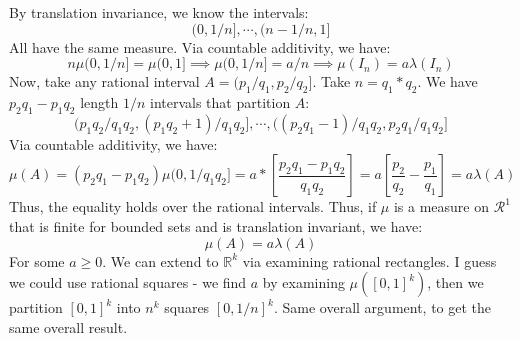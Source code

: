\documentclass[12pt,a4paper]{article}
\newcommand{\1}[1]{\mathbbm{1}\left\{ #1 \right\}}
\newcommand{\R}{\mathbb{R}}
\newcommand{\rcal}{\mathcal{R}}
\begin{document}
By translation invariance, we know the intervals:
$$
	(0,1/n], \cdots, (n-1/n,1]
$$
All have the same measure. Via countable additivity, we have:
$$
	n\mu(0,1/n] = \mu(0,1] \implies \mu(0,1/n] = a/n \implies
	\mu(I_n) = a\lambda(I_n)
$$
Now, take any rational interval $A = (p_1/q_1,p_2/q_2]$. Take $n = q_1 * q_2$. We have $p_2q_1 - p_1q_2$ length $1/n$ intervals that partition $A$:
$$
	(p_1q_2/q_1q_2, (p_1q_2 + 1)/q_1q_2], \cdots,
	((p_2q_1-1)/q_1q_2, p_2q_1/q_1q_2]
$$
Via countable additivity, we have:
$$
	\mu(A) = (p_2q_1 - p_1q_2)\mu(0,1/q_1q_2] =
	a * \left[\frac{p_2q_1 - p_1q_2}{q_1q_2}\right] = a \left[\frac{p_2}{q_2} - \frac{p_1}{q_1}\right] = a\lambda(A)
$$
Thus, the equality holds over the rational intervals. Thus, if $\mu$ is a measure on $\rcal^1$ that is finite for bounded sets and is translation invariant, we have:
$$
	\mu(A) = a\lambda(A)
$$
For some $a \geq 0$. We can extend to $\R^k$ via examining rational rectangles. I guess we could use rational squares - we find $a$ by examining $\mu([0,1]^k)$, then we partition $[0,1]^k$ into $n^k$ squares $[0,1/n]^k$. Same overall argument, to get the same overall result.
\end{document}
